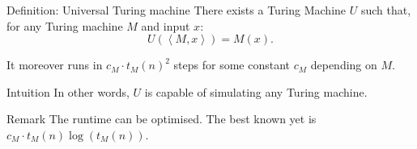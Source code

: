 \documentclass[a4paper]{article}
\begin{document}
\begin{parag}{Definition: Universal Turing machine}
    There exists a Turing Machine $U$ such that, for any Turing machine $M$ and input $x$: 
    \[U\left(\left\langle M, x \right\rangle\right) = M\left(x\right).\]

    It moreover runs in $c_M \cdot t_M\left(n\right)^2$ steps for some constant $c_M$ depending on $M$.

    \begin{subparag}{Intuition}
        In other words, $U$ is capable of simulating any Turing machine.
    \end{subparag}

    \begin{subparag}{Remark}
        The runtime can be optimised. The best known yet is $c_M \cdot t_M\left(n\right) \log\left(t_M\left(n\right)\right)$.
    \end{subparag}
\end{parag}
\end{document}
